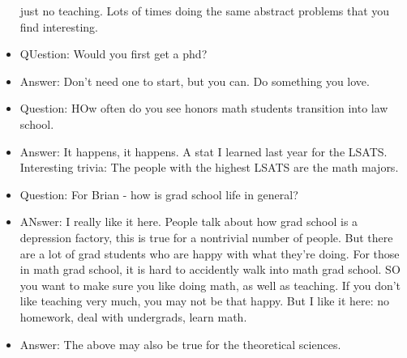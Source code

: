 \documentclass[10pt]{article}
\theoremstyle{definition}
\begin{document}
\begin{itemize}
    just no teaching. Lots of times doing the same abstract
    problems that you find interesting. 
  \item QUestion: Would you first get a phd?
  \item Answer: Don't need one to start, but you can. Do something
    you love.
  \item Question: HOw often do you see honors math students
    transition into law school.
  \item Answer: It happens, it happens. A stat I learned last year
    for the LSATS. Interesting trivia: The people with the highest
    LSATS are the math majors. 
  \item Question: For Brian - how is grad school life in general?
  \item ANswer: I really like it here. People talk about how grad
    school is a depression factory, this is true for a nontrivial
    number of people. But there are a lot of grad students who are
    happy with what they're doing. For those in math grad school,
    it is hard to accidently walk into math grad school. SO you
    want to make sure you like doing math, as well as teaching. If
    you don't like teaching very much, you may not be that
    happy. But I like it here: no homework, deal with undergrads,
    learn math. 
  \item Answer: The above may also be true for the theoretical
    sciences.
\end{itemize}
\end{document}
